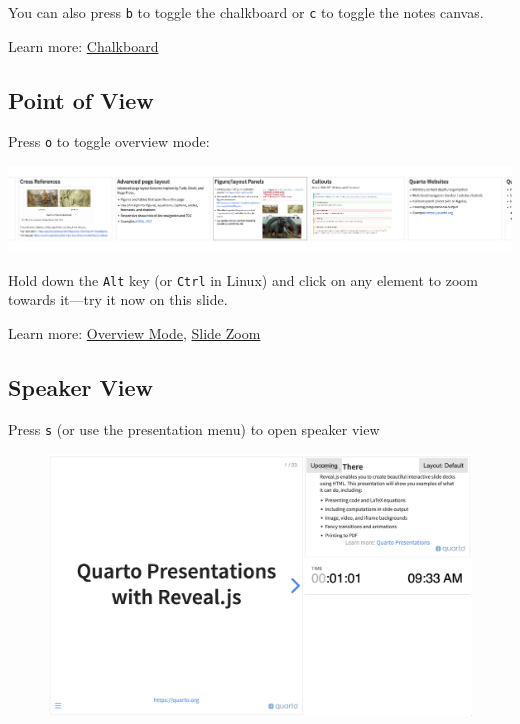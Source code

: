 \documentclass[
  letterpaper,
  DIV=11,
  numbers=noendperiod]{scrartcl}
\begin{document}
You can also press \texttt{b} to toggle the chalkboard or \texttt{c} to
toggle the notes canvas.

Learn more:
\href{https://quarto.org/docs/presentations/revealjs/presenting.html\#chalkboard}{Chalkboard}

\hypertarget{point-of-view}{%
\subsection{Point of View}\label{point-of-view}}

Press \texttt{o} to toggle overview mode:

\includegraphics{images/overview-mode.png}

Hold down the \texttt{Alt} key (or \texttt{Ctrl} in Linux) and click on
any element to zoom towards it---try it now on this slide.

Learn more:
\href{https://quarto.org/docs/presentations/revealjs/presenting.html\#overview-mode}{Overview
Mode},
\href{https://quarto.org/docs/presentations/revealjs/presenting.html\#slide-zoom}{Slide
Zoom}

\hypertarget{speaker-view}{%
\subsection{Speaker View}\label{speaker-view}}

Press \texttt{s} (or use the presentation menu) to open speaker view

\begin{figure}

{\centering \includegraphics[width=8.125in,height=\textheight]{images/speaker-view.png}

}

\end{figure}
\end{document}
